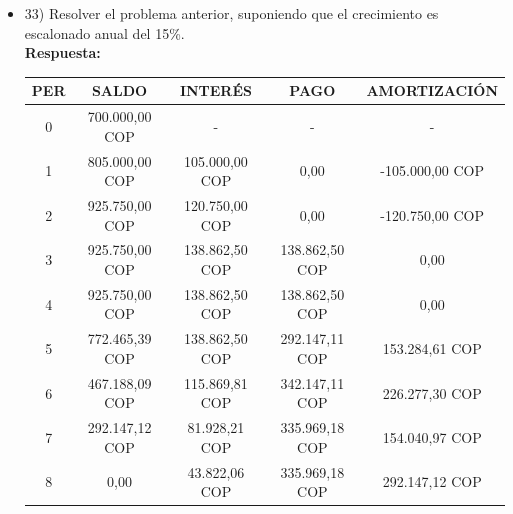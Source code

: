 \begin{itemize}
 \item 33)	 Resolver el problema anterior, suponiendo que el crecimiento es escalonado anual del 15\%. \\
       \textbf{Respuesta:}
      \begin{center}
        \begin{tabular}{| c | c | c | c | c |}\hline
           \textbf{PER} & \textbf{SALDO} & \textbf{INTERÉS} & \textbf{PAGO} & \textbf{AMORTIZACIÓN}  \\ \hline
        0 & 700.000,00 COP & - & - & - \\ \hline
        1 & 805.000,00 COP & 105.000,00 COP & 0,00 & -105.000,00 COP \\ \hline
        2 & 925.750,00 COP & 120.750,00 COP & 0,00 & -120.750,00 COP \\ \hline
        3 & 925.750,00 COP & 138.862,50 COP & 138.862,50 COP & 0,00 \\ \hline
        4 & 925.750,00 COP & 138.862,50 COP & 138.862,50 COP & 0,00 \\ \hline
        5 & 772.465,39 COP & 138.862,50 COP & 292.147,11 COP & 153.284,61 COP\\ \hline
        6 & 467.188,09 COP & 115.869,81 COP & 342.147,11 COP & 226.277,30 COP \\ \hline
        7 & 292.147,12 COP & 81.928,21 COP & 335.969,18 COP & 154.040,97 COP \\ \hline
        8 & 0,00 & 43.822,06 COP & 335.969,18 COP & 292.147,12 COP \\ \hline
        \end{tabular}\\
        \end{center}


\end{itemize}
